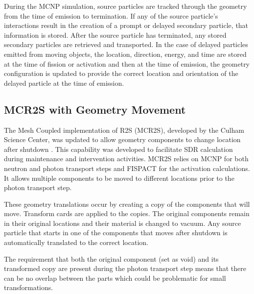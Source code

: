 During the MCNP simulation, source particles are tracked through the geometry
from the time of emission to termination.  If any of the source particle's
interactions result in the creation of a prompt or delayed secondary particle,
that information is stored.  After the source particle has terminated, any
stored secondary particles are retrieved and transported.
In the case of delayed particles emitted from moving objects, the location, direction, energy, and
time are stored at the time of fission or activation and then at the time of
emission, the geometry configuration is updated to provide the correct 
location and orientation of the delayed particle at the time of emission. 



\subsection{MCR2S with Geometry Movement}
The Mesh Coupled implementation of R2S (MCR2S), developed by the Culham Science Center, 
was updated to allow geometry components to change location after shutdown \cite{mcr2s}.
This capability was developed to facilitate SDR calculation during maintenance and
intervention activities.  MCR2S relies on MCNP for both neutron and photon
transport steps and FISPACT for the activation calculations. 
It allows multiple components to be moved to
different locations prior to the photon transport step.

These geometry translations occur by creating a copy of the
components that will move.  Transform cards are applied to the copies. 
The original components remain in their original locations and their material
is changed to vacuum.  Any source particle that starts in one of the
components that moves after shutdown is automatically translated to the correct
location. %

The requirement that both the original component (set as void) and its
transformed copy are present during the photon transport step means that there
can be no overlap between the parts which could be problematic for small
transformations.

